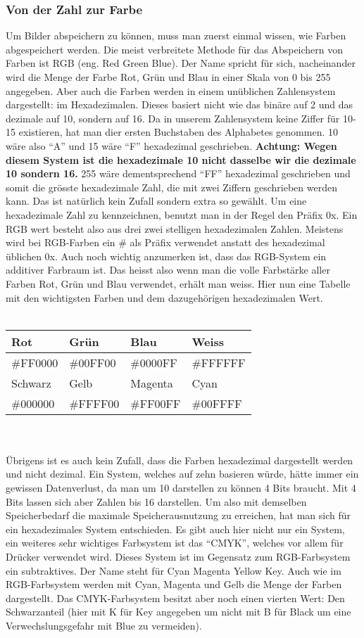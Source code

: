 \subsubsection{Von der Zahl zur Farbe}
Um Bilder abspeichern zu können, muss man zuerst einmal wissen, wie Farben abgespeichert werden. Die meist verbreitete Methode für das Abspeichern von Farben ist RGB (eng. Red Green Blue). Der Name spricht für sich, nacheinander wird die Menge der Farbe Rot, Grün und Blau in einer Skala von 0 bis 255 angegeben. Aber auch die Farben werden in einem unüblichen Zahlensystem dargestellt: im Hexadezimalen. Dieses basiert nicht wie das binäre auf 2 und das dezimale auf 10, sondern auf 16. Da in unserem Zahlensystem keine Ziffer für 10-15 existieren, hat man dier ersten Buchstaben des Alphabetes genommen. 10 wäre also "`A"' und 15 wäre "`F"' hexadezimal geschrieben. \textbf{Achtung: Wegen diesem System ist die hexadezimale 10 nicht dasselbe wir die dezimale 10 sondern 16.} 255 wäre dementsprechend "`FF"' hexadezimal geschrieben und somit die grösste hexadezimale Zahl, die mit zwei Ziffern geschrieben werden kann. Das ist natürlich kein Zufall sondern extra so gewählt. Um eine hexadezimale Zahl zu kennzeichnen, benutzt man in der Regel den Präfix 0x. Ein RGB wert besteht also aus drei zwei stelligen hexadezimalen Zahlen. Meistens wird bei RGB-Farben ein \# als Präfix verwendet anstatt des hexadezimal üblichen 0x. Auch noch wichtig anzumerken ist, dass das RGB-System ein additiver Farbraum ist. Das heisst also wenn man die volle Farbstärke aller Farben Rot, Grün und Blau verwendet, erhält man weiss. Hier nun eine Tabelle mit den wichtigsten Farben und dem dazugehörigen hexadezimalen Wert. \\
\\
\begin{tabular}{|l|l|l|l|}
\hline
Rot & Grün & Blau & Weiss \\ \hline
\#FF0000  & \#00FF00 & \#0000FF & \#FFFFFF \\ \hline\lstset{language=Pascal} 
Schwarz & Gelb & Magenta & Cyan \\ \hline
\#000000 & \#FFFF00 & \#FF00FF & \#00FFFF \\ \hline
\end{tabular} \\
\\
Übrigens ist es auch kein Zufall, dass die Farben hexadezimal dargestellt werden und nicht dezimal. Ein System, welches auf zehn basieren würde, hätte immer ein gewissen Datenverlust, da man um 10 darstellen zu können 4 Bits braucht. Mit 4 Bits lassen sich aber Zahlen bis 16 darstellen. Um also mit demselben Speicherbedarf die maximale Speicherausnutzung zu erreichen, hat man sich für ein hexadezimales System entschieden. Es gibt auch hier nicht nur ein System, ein weiteres sehr wichtiges Farbsystem ist das "`CMYK"', welches vor allem für Drücker verwendet wird. Dieses System ist im Gegensatz zum RGB-Farbsystem ein subtraktives. Der Name steht für Cyan Magenta Yellow Key. Auch wie im RGB-Farbsystem werden mit Cyan, Magenta und Gelb die Menge der Farben dargestellt. Das CMYK-Farbsystem besitzt aber noch einen vierten Wert: Den Schwarzanteil (hier mit K für Key angegeben um nicht mit B für Black um eine Verwechslungsgefahr mit Blue zu vermeiden).
